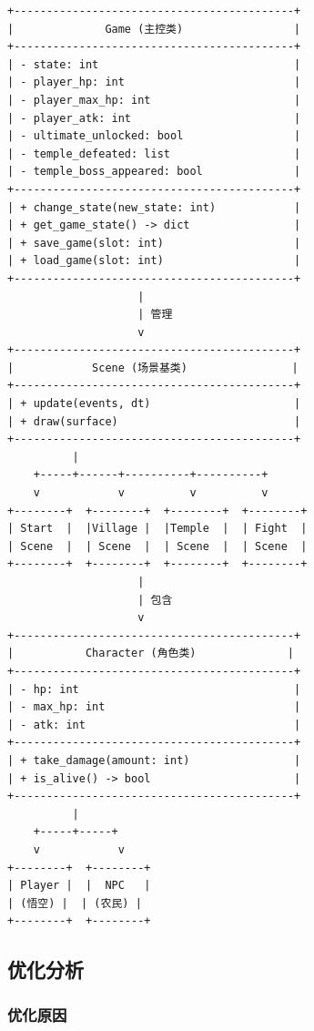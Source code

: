 \documentclass[a4paper,12pt]{article}
\begin{document}
\begin{verbatim}
+-------------------------------------------+
|              Game (主控类)                 |
+-------------------------------------------+
| - state: int                              |
| - player_hp: int                          |
| - player_max_hp: int                      |
| - player_atk: int                         |
| - ultimate_unlocked: bool                 |
| - temple_defeated: list                   |
| - temple_boss_appeared: bool              |
+-------------------------------------------+
| + change_state(new_state: int)            |
| + get_game_state() -> dict                |
| + save_game(slot: int)                    |
| + load_game(slot: int)                    |
+-------------------------------------------+
                    |
                    | 管理
                    v
+-------------------------------------------+
|            Scene (场景基类)                |
+-------------------------------------------+
| + update(events, dt)                      |
| + draw(surface)                           |
+-------------------------------------------+
          |
    +-----+------+----------+----------+
    v            v          v          v
+--------+  +--------+  +--------+  +--------+
| Start  |  |Village |  |Temple  |  | Fight  |
| Scene  |  | Scene  |  | Scene  |  | Scene  |
+--------+  +--------+  +--------+  +--------+
                    |
                    | 包含
                    v
+-------------------------------------------+
|           Character (角色类)              |
+-------------------------------------------+
| - hp: int                                 |
| - max_hp: int                             |
| - atk: int                                |
+-------------------------------------------+
| + take_damage(amount: int)                |
| + is_alive() -> bool                      |
+-------------------------------------------+
          |
    +-----+-----+
    v            v
+--------+  +--------+
| Player |  |  NPC   |
| (悟空) |  | (农民) |
+--------+  +--------+
\end{verbatim}

\subsection{优化分析}

\subsubsection{优化原因}
\end{document}
